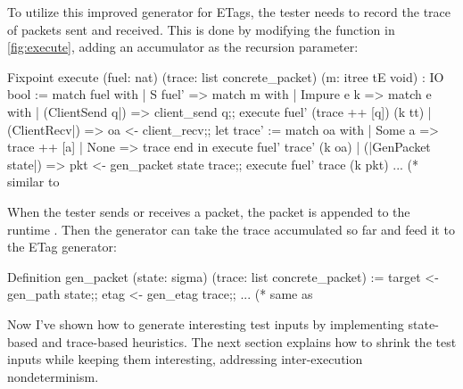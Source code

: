 To utilize this improved generator for ETags, the tester needs to record the
trace of packets sent and received.  This is done by modifying the 
function in \autoref{fig:execute}, adding an accumulator as the recursion parameter:
\begin{coq}
  Fixpoint execute (fuel: nat) (trace: list concrete_packet)
                   (m: itree tE void) : IO bool :=
    match fuel with
    | S fuel' =>
      match m with
      | Impure e k =>
        match e with
        | (ClientSend q|) => client_send q;;
                             execute fuel' (trace ++ [q]) (k tt)
        | (ClientRecv|)   => oa <- client_recv;;                             
                             let trace' := match oa with
                                           | Some a => trace ++ [a]
                                           | None   => trace
                                           end in
                             execute fuel' trace' (k oa)
        | (|GenPacket state|) => pkt <- gen_packet state trace;;
                                 execute fuel' trace (k pkt)
        ... (* similar to %
\end{coq}

When the tester sends or receives a packet, the packet is appended to the
runtime .  Then the  generator can take the trace
accumulated so far and feed it to the ETag generator:
\begin{coq}
  Definition gen_packet (state: sigma) (trace: list concrete_packet) :=
    target <- gen_path state;;
    etag   <- gen_etag trace;;
    ... (* same as %
\end{coq}

Now I've shown how to generate interesting test inputs by implementing
state-based and trace-based heuristics.  The next section explains how to shrink
the test inputs while keeping them interesting, addressing inter-execution
nondeterminism.

